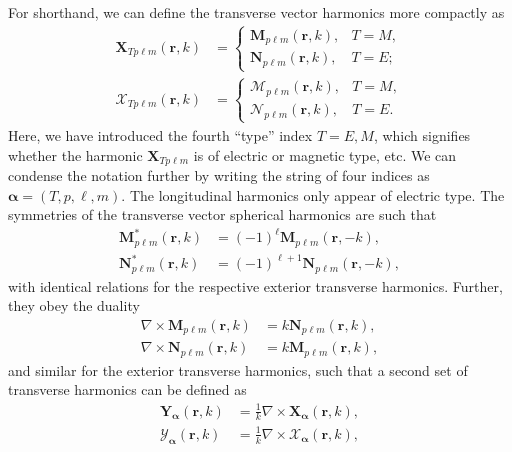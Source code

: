 \documentclass{article}
\numberwithin{equation}{section}
\begin{document}
For shorthand, we can define the transverse vector harmonics more compactly as
\begin{equation}
\begin{split}
\mathbf{X}_{Tp\ell m}(\mathbf{r},k) &= 
\begin{cases}
\mathbf{M}_{p\ell m}(\mathbf{r},k), & T=M,\\
\mathbf{N}_{p\ell m}(\mathbf{r},k), & T=E;
\end{cases}\\[1.0em]
\bm{\mathcal{X}}_{Tp\ell m}(\mathbf{r},k) &=
\begin{cases}
\bm{\mathcal{M}}_{p\ell m}(\mathbf{r},k), & T=M,\\
\bm{\mathcal{N}}_{p\ell m}(\mathbf{r},k), & T=E.
\end{cases}
\end{split}
\end{equation}
Here, we have introduced the fourth ``type'' index $T = E,M$, which signifies whether the harmonic $\mathbf{X}_{Tp\ell m}$ is of electric or magnetic type, etc. We can condense the notation further by writing the string of four indices as $\bm{\alpha} = (T,p,\ell,m)$. The longitudinal harmonics only appear of electric type. The symmetries of the transverse vector spherical harmonics are such that
\begin{equation}
\begin{split}
\mathbf{M}_{p\ell m}^*(\mathbf{r},k) &= (-1)^\ell\mathbf{M}_{p\ell m}(\mathbf{r},-k),\\
\mathbf{N}_{p\ell m}^*(\mathbf{r},k) &= (-1)^{\ell + 1}\mathbf{N}_{p\ell m}(\mathbf{r},-k),
\end{split}
\end{equation}
with identical relations for the respective exterior transverse harmonics. Further, they obey the duality
\begin{equation}
\begin{split}
\nabla\times\mathbf{M}_{p\ell m}(\mathbf{r},k) &= k\mathbf{N}_{p\ell m}(\mathbf{r},k),\\
\nabla\times\mathbf{N}_{p\ell m}(\mathbf{r},k) &= k\mathbf{M}_{p\ell m}(\mathbf{r},k),
\end{split}
\end{equation}
and similar for the exterior transverse harmonics, such that a second set of transverse harmonics can be defined as 
\begin{equation}
\begin{split}
\mathbf{Y}_{\bm{\alpha}}(\mathbf{r},k) &= \frac{1}{k}\nabla\times\mathbf{X}_{\bm{\alpha}}(\mathbf{r},k),\\
\bm{\mathcal{Y}}_{\bm{\alpha}}(\mathbf{r},k) &= \frac{1}{k}\nabla\times\bm{\mathcal{X}}_{\bm{\alpha}}(\mathbf{r},k),
\end{split}
\end{equation}
\end{document}

